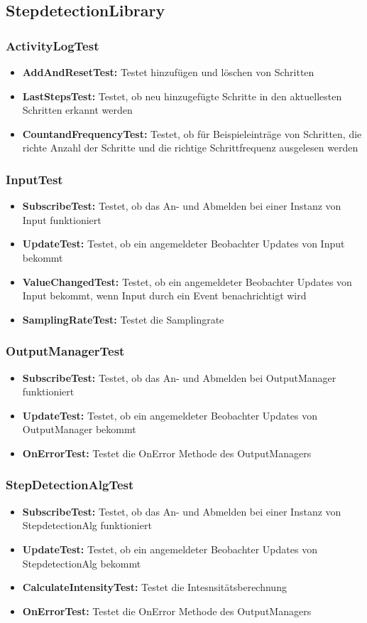 \documentclass[../validierung.tex]{subfiles}
\begin{document}
\subsection{StepdetectionLibrary}
\subsubsection{ActivityLogTest}
\begin{itemize}
\item \textbf{AddAndResetTest:} Testet hinzufügen und löschen von Schritten
\item \textbf{LastStepsTest:} Testet, ob neu hinzugefügte Schritte in den aktuellesten Schritten erkannt werden
\item \textbf{CountandFrequencyTest:} Testet, ob für Beispieleinträge von Schritten, die richte Anzahl der Schritte und die richtige Schrittfrequenz ausgelesen werden
\end{itemize}
\subsubsection{InputTest}
\begin{itemize}
\item \textbf{SubscribeTest:} Testet, ob das An- und Abmelden bei einer Instanz von Input funktioniert
\item \textbf{UpdateTest:} Testet, ob ein angemeldeter Beobachter Updates von Input bekommt
\item \textbf{ValueChangedTest:} Testet, ob ein angemeldeter Beobachter Updates von Input bekommt, wenn Input durch ein Event benachrichtigt wird
\item \textbf{SamplingRateTest:} Testet die Samplingrate
\end{itemize}
\subsubsection{OutputManagerTest}
\begin{itemize}
\item \textbf{SubscribeTest:} Testet, ob das An- und Abmelden bei OutputManager funktioniert
\item \textbf{UpdateTest:} Testet, ob ein angemeldeter Beobachter Updates von OutputManager bekommt
\item \textbf{OnErrorTest:} Testet die OnError Methode des OutputManagers
\end{itemize}
\subsubsection{StepDetectionAlgTest}
\begin{itemize}
\item \textbf{SubscribeTest:} Testet, ob das An- und Abmelden bei einer Instanz von StepdetectionAlg funktioniert
\item \textbf{UpdateTest:} Testet, ob ein angemeldeter Beobachter Updates von StepdetectionAlg bekommt
\item \textbf{CalculateIntensityTest:} Testet die Intesnsitätsberechnung
\item \textbf{OnErrorTest:} Testet die OnError Methode des OutputManagers
\end{itemize}
\end{document}

